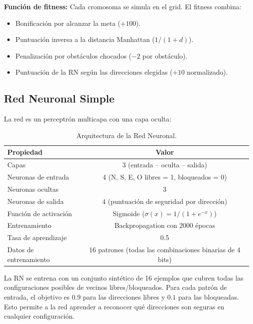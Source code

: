 \documentclass[12pt,a4paper]{article}
\begin{document}
\textbf{Funci\'on de fitness:} Cada cromosoma se simula en el grid. El fitness combina:
\begin{itemize}
  \item Bonificación por alcanzar la meta ($+100$).
  \item Puntuaci\'on inversa a la distancia Manhattan ($1/(1+d)$).
  \item Penalizaci\'on por obst\'aculos chocados ($-2$ por obst\'aculo).
  \item Puntuaci\'on de la RN seg\'un las direcciones elegidas ($+10$ normalizado).
\end{itemize}

\subsection{Red Neuronal Simple}

La red es un perceptr\'on multicapa con una capa oculta:

\begin{table}[H]
\centering
\caption{Arquitectura de la Red Neuronal.}
\label{tab:nn}
\begin{tabular}{l c}
\toprule
\textbf{Propiedad} & \textbf{Valor} \\
\midrule
Capas & 3 (entrada -- oculta -- salida) \\
Neuronas de entrada & 4 (N, S, E, O libres = 1, bloqueados = 0) \\
Neuronas ocultas & 3 \\
Neuronas de salida & 4 (puntuaci\'on de seguridad por direcci\'on) \\
Funci\'on de activaci\'on & Sigmoide ($\sigma(x) = 1/(1+e^{-x})$) \\
Entrenamiento & Backpropagation con 2000 \'epocas \\
Tasa de aprendizaje & 0.5 \\
Datos de entrenamiento & 16 patrones (todas las combinaciones binarias de 4 bits) \\
\bottomrule
\end{tabular}
\end{table}

La RN se entrena con un conjunto sint\'etico de 16 ejemplos que cubren todas las configuraciones posibles de vecinos libres/bloqueados. Para cada patr\'on de entrada, el objetivo es $0.9$ para las direcciones libres y $0.1$ para las bloqueadas. Esto permite a la red aprender a reconocer qu\'e direcciones son seguras en cualquier configuraci\'on.

\end{document}
